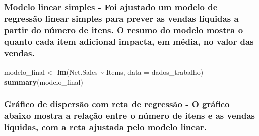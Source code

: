 \documentclass[
]{article}
\newenvironment{Shaded}{\begin{snugshade}}{\end{snugshade}}
\newcommand{\AttributeTok}[1]{\textcolor[rgb]{0.13,0.29,0.53}{#1}}
\newcommand{\ConstantTok}[1]{\textcolor[rgb]{0.56,0.35,0.01}{#1}}
\newcommand{\FunctionTok}[1]{\textcolor[rgb]{0.13,0.29,0.53}{\textbf{#1}}}
\newcommand{\NormalTok}[1]{#1}
\newcommand{\OtherTok}[1]{\textcolor[rgb]{0.56,0.35,0.01}{#1}}
\newcommand{\SpecialCharTok}[1]{\textcolor[rgb]{0.81,0.36,0.00}{\textbf{#1}}}
\newcommand{\StringTok}[1]{\textcolor[rgb]{0.31,0.60,0.02}{#1}}
\begin{document}
\subsubsection{Modelo linear simples - Foi ajustado um modelo de
regressão linear simples para prever as vendas líquidas a partir do
número de itens. O resumo do modelo mostra o quanto cada item adicional
impacta, em média, no valor das
vendas.}\label{modelo-linear-simples---foi-ajustado-um-modelo-de-regressuxe3o-linear-simples-para-prever-as-vendas-luxedquidas-a-partir-do-nuxfamero-de-itens.-o-resumo-do-modelo-mostra-o-quanto-cada-item-adicional-impacta-em-muxe9dia-no-valor-das-vendas.}

\begin{Shaded}
\begin{Highlighting}[]
\NormalTok{modelo\_final }\OtherTok{\textless{}{-}} \FunctionTok{lm}\NormalTok{(Net.Sales }\SpecialCharTok{\textasciitilde{}}\NormalTok{ Items, }\AttributeTok{data =}\NormalTok{ dados\_trabalho)}
\FunctionTok{summary}\NormalTok{(modelo\_final)}
\end{Highlighting}
\end{Shaded}

\subsubsection{Gráfico de dispersão com reta de regressão - O gráfico
abaixo mostra a relação entre o número de itens e as vendas líquidas,
com a reta ajustada pelo modelo
linear.}\label{gruxe1fico-de-dispersuxe3o-com-reta-de-regressuxe3o---o-gruxe1fico-abaixo-mostra-a-relauxe7uxe3o-entre-o-nuxfamero-de-itens-e-as-vendas-luxedquidas-com-a-reta-ajustada-pelo-modelo-linear.}

\begin{Shaded}
\end{Shaded}
\end{document}
